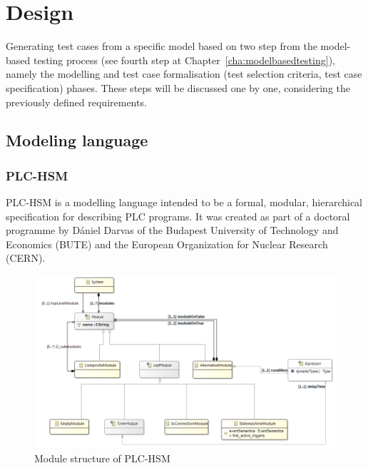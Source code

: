 \chapter{Design}
\label{cha:design}

Generating test cases from a specific model based on two step from the model-based testing process (see fourth step at Chapter~\ref{cha:modelbasedtesting}), namely the modelling and test case formalisation (test selection criteria, test case specification) phases. These steps will be discussed one by one, considering the previously defined requirements. 

\section{Modeling language}
\label{sec:modelinglanguage}

\subsection{PLC-HSM}
\label{sub:plchsm}

PLC-HSM is a modelling language intended to be a formal,
modular, hierarchical specification for describing PLC programs. It was created as part of a doctoral programme by Dániel Darvas of the Budapest University of Technology and Economics (BUTE) and the European Organization for Nuclear Research (CERN).

\begin{figure}[htp]
\centering
\includegraphics[scale=0.4]{figures/plchsm_modules}
\caption{Module structure of PLC-HSM}
\label{fig:plchsm_modules}
\end{figure}

